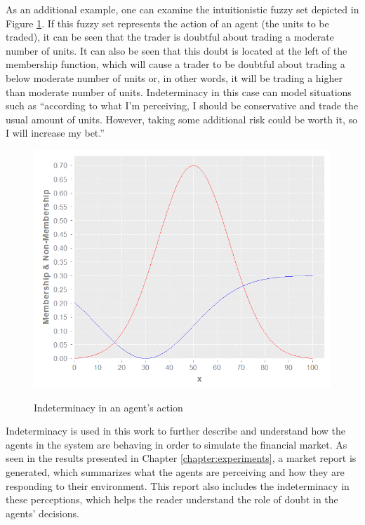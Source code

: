 As an additional example, one can examine the intuitionistic fuzzy set depicted
in Figure \ref{figure:indeterminacy-in-an-agents-action}. If this fuzzy set
represents the action of an agent (the units to be traded), it can be seen that
the trader is doubtful about trading a moderate number of units. It can also be
seen that this doubt is located at the left of the membership function, which
will cause a trader to be doubtful about trading a below moderate number of
units or, in other words, it will be trading a higher than moderate number of
units. Indeterminacy in this case can model situations such as ``according to
what I'm perceiving, I should be conservative and trade the usual amount of
units. However, taking some additional risk could be worth it, so I will
increase my bet.''

\begin{figure}
\caption{Indeterminacy in an agent's action} \centering
\includegraphics[width=1.0\textwidth]{img/example-of-ifs.png}
\label{figure:indeterminacy-in-an-agents-action}
\end{figure}

Indeterminacy is used in this work to further describe and understand how the
agents in the system are behaving in order to simulate the financial market. As
seen in the results presented in Chapter \ref{chapter:experiments}, a market
report is generated, which summarizes what the agents are perceiving and how
they are responding to their environment. This report also includes the
indeterminacy in these perceptions, which helps the reader understand the role
of doubt in the agents' decisions.

